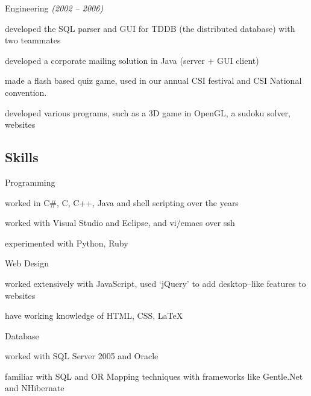 \documentclass[a4paper,10pt,final]{article}
\newcommand{\resumetitle}[1]{%
	\subsection*{%
		\hspace{-5pt}\large#1%
	}%
	
	\medskip%
}%
\newcommand{\resumedescheader}[1]{%
	\resumetitle{#1}
}%
\newenvironment{resumedescription}{%
	\begin{basedescript}{\desclabelstyle{\nextlinelabel}\desclabelwidth{0.15\linewidth}}{%
		\renewcommand{\makelabel}[1]{\textsl{##1}}%
	}%
	}{%
	\end{basedescript}%
}
\begin{document}
	\begin{resumedescription}
		\item[Engineering \hfill \emph {(2002 -- 2006)}]
		\begin{itemize*}
			\item developed the SQL parser and GUI for TDDB (the distributed database) with two teammates
			\item developed a corporate mailing solution in Java (server + GUI client)
			\item made a flash based quiz game, used in our annual CSI festival and CSI National convention.
			\item developed various programs, such as a 3D game in OpenGL, a sudoku solver, websites
		\end{itemize*}
	\end{resumedescription}

\resumedescheader{Skills}
	\begin{resumedescription}
		\item [Programming]
				\begin{itemize*}
				\item worked in C\#, C, C++, Java and shell scripting over the years
				\item worked with Visual Studio and Eclipse, and vi/emacs over ssh
				\item experimented with Python, Ruby
				\end{itemize*}

		\item [Web Design] 
				\begin{itemize*}
				\item worked extensively with JavaScript, used `jQuery' to add desktop--like features to websites
				\item have working knowledge of HTML, CSS, \LaTeX
				\end{itemize*}

		\item [Database] 
				\begin{itemize*}
				\item worked with SQL Server 2005 and Oracle
				\item familiar with SQL and OR Mapping techniques with frameworks like Gentle.Net and NHibernate
				\end{itemize*}

	\end{resumedescription}
\end{document}
